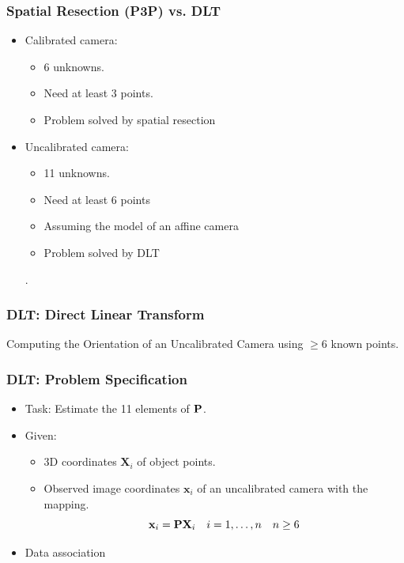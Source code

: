 \begin{frame}
  \frametitle{Spatial Resection (P3P) vs. DLT}
  \begin{itemize}
    \item Calibrated camera: 
    \begin{itemize}
      \item 6 unknowns.
      \item Need at least 3 points.
      \item Problem solved by spatial resection
    \end{itemize}
    \item Uncalibrated camera: 
    \begin{itemize}
      \item 11 unknowns.
      \item Need at least 6 points 
      \item Assuming the model of an affine camera
      \item Problem solved by DLT
    \end{itemize}.
  \end{itemize}
\end{frame}

\begin{frame}
  \frametitle{DLT: Direct Linear Transform}
  Computing the Orientation of an Uncalibrated Camera using $\ge 6$ known points.
\end{frame}

\begin{frame}
  \frametitle{DLT: Problem Specification}
  \begin{itemize}
    \item Task: Estimate the 11 elements of $\boldsymbol{\mathbf{P}}$.
    \item Given: 
    \begin{itemize}
      \item 3D coordinates $\mathbf{X}_{i}$ of object points.
      \item Observed image coordinates $\mathbf{x}_{i}$ of an uncalibrated camera with the mapping.
      \begin{equation*}
        \boldsymbol{\mathbf{x}}_{i} = \boldsymbol{\mathbf{P}} \boldsymbol{\mathbf{X}}_{i} \quad i=1,\ldots,n \quad n \ge 6
      \end{equation*}
    \end{itemize}
    \item Data association
  \end{itemize}

\end{frame}

